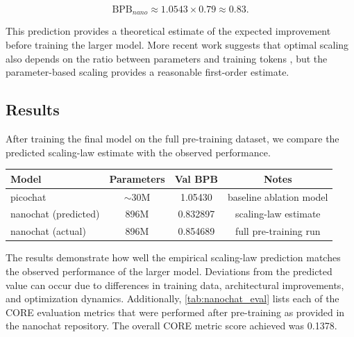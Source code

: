 \documentclass[a4paper,12pt]{article}
\begin{document}
\[
\text{BPB}_{nano} \approx 1.0543 \times 0.79 \approx 0.83 .
\]

This prediction provides a theoretical estimate of the expected improvement before training the larger model. More recent work suggests that optimal scaling also depends on the ratio between parameters and training tokens \cite{hoffmann2022training}, but the parameter-based scaling provides a reasonable first-order estimate.

\subsection{Results}

After training the final model on the full pre-training dataset, we compare the predicted scaling-law estimate with the observed performance.

\begin{center}
\begin{tabular}{lccc}
\hline
Model & Parameters & Val BPB & Notes \\
\hline
picochat & $\sim$30M & 1.05430 & baseline ablation model \\
nanochat (predicted) & 896M & 0.832897 & scaling-law estimate \\
nanochat (actual) & 896M & 0.854689 & full pre-training run \\
\hline
\end{tabular}
\end{center}

The results demonstrate how well the empirical scaling-law prediction matches the observed performance of the larger model. Deviations from the predicted value can occur due to differences in training data, architectural improvements, and optimization dynamics. Additionally, \autoref{tab:nanochat_eval} lists each of the CORE evaluation metrics that were performed after pre-training as provided in the nanochat repository. The overall CORE metric score achieved was 0.1378.
\end{document}
